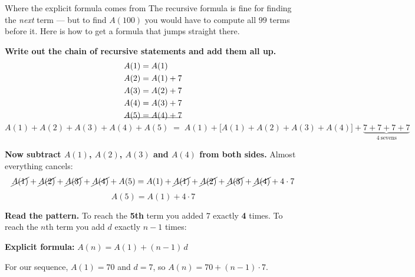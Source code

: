 \documentclass[11pt]{article}
\newcommand{\ans}[1]{\boxed{#1}}
\begin{document}
\begin{deepbox}{Where the explicit formula comes from}
The recursive formula is fine for finding the \emph{next} term --- but to find $A(100)$ you would
have to compute all $99$ terms before it. Here is how to get a formula that jumps straight there.

\vspace{5pt}
\textbf{Write out the chain of recursive statements and add them all up.}
\begin{align*}
A(1) &= A(1)\\
A(2) &= A(1)+7\\
A(3) &= A(2)+7\\
A(4) &= A(3)+7\\
A(5) &= A(4)+7\\[-4pt]
\hline
\end{align*}
\vspace{-14pt}
\[
A(1)+A(2)+A(3)+A(4)+A(5)
\;=\;
A(1)+\Big[A(1)+A(2)+A(3)+A(4)\Big]+\underbrace{7+7+7+7}_{4\ \text{sevens}}
\]

\vspace{4pt}
\textbf{Now subtract $A(1)$, $A(2)$, $A(3)$ and $A(4)$ from both sides.}
Almost everything cancels:
\[
\cancel{A(1)}+\cancel{A(2)}+\cancel{A(3)}+\cancel{A(4)}+A(5)
=A(1)+\cancel{A(1)}+\cancel{A(2)}+\cancel{A(3)}+\cancel{A(4)}+4\cdot 7
\]
\[
\ans{A(5)=A(1)+4\cdot 7}
\]

\vspace{5pt}
\textbf{Read the pattern.} To reach the \textbf{5th} term you added $7$ exactly \textbf{4} times.
To reach the $n$th term you add $d$ exactly $n-1$ times:
\begin{center}
\end{center}

\begin{center}
\begin{tcolorbox}[colback=white,colframe=violet,arc=2pt,boxrule=1.4pt,width=0.8\linewidth]
\centering
{\large \textbf{Explicit formula:} \qquad $A(n)=A(1)+(n-1)\,d$}
\end{tcolorbox}
\end{center}
For our sequence, $A(1)=70$ and $d=7$, so $A(n)=70+(n-1)\cdot 7$.
\end{deepbox}
\end{document}
